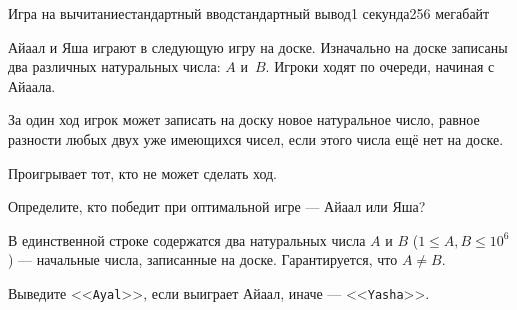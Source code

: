 \begin{problem}{Игра на вычитание}{стандартный ввод}{стандартный вывод}{1 секунда}{256 мегабайт}

Айаал и Яша играют в следующую игру на доске. Изначально на доске записаны два различных натуральных числа: $A$ и~$B$. Игроки ходят по очереди, начиная с Айаала.

За один ход игрок может записать на доску новое натуральное число, равное разности любых двух уже имеющихся чисел, если этого числа ещё нет на доске.

Проигрывает тот, кто не может сделать ход.

Определите, кто победит при оптимальной игре --- Айаал или Яша?

\InputFile
В единственной строке содержатся два натуральных числа $A$ и $B$ ($1\le A, B\le 10^6$) --- начальные числа, записанные на доске. Гарантируется, что $A\neq B$.

\OutputFile
Выведите <<\texttt{Ayal}>>, если выиграет Айаал, иначе --- <<\texttt{Yasha}>>.

\Examples

\begin{example}
%
%
\end{example}

\end{problem}

